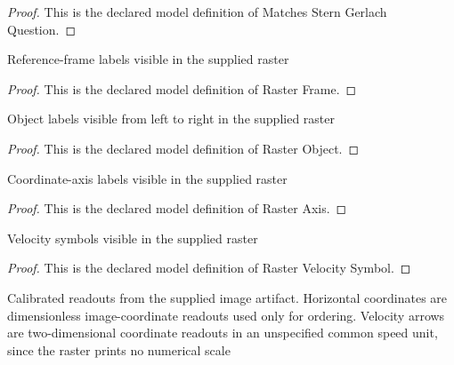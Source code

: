 \begin{proof}
  This is the declared model definition of Matches Stern Gerlach Question.
\end{proof}
\begin{definition}
  \label{def:physics:phyx-mini-0541:phyxminiproblems-problemphyxmini0541-rasterframe}
  Reference-frame labels visible in the supplied raster
\end{definition}
\begin{proof}
  This is the declared model definition of Raster Frame.
\end{proof}
\begin{definition}
  \label{def:physics:phyx-mini-0541:phyxminiproblems-problemphyxmini0541-rasterobject}
  Object labels visible from left to right in the supplied raster
\end{definition}
\begin{proof}
  This is the declared model definition of Raster Object.
\end{proof}
\begin{definition}
  \label{def:physics:phyx-mini-0541:phyxminiproblems-problemphyxmini0541-rasteraxis}
  Coordinate-axis labels visible in the supplied raster
\end{definition}
\begin{proof}
  This is the declared model definition of Raster Axis.
\end{proof}
\begin{definition}
  \label{def:physics:phyx-mini-0541:phyxminiproblems-problemphyxmini0541-rastervelocitysymbol}
  Velocity symbols visible in the supplied raster
\end{definition}
\begin{proof}
  This is the declared model definition of Raster Velocity Symbol.
\end{proof}
\begin{definition}
  \label{def:physics:phyx-mini-0541:phyxminiproblems-problemphyxmini0541-suppliedrelativityraster}
  Calibrated readouts from the supplied image artifact. Horizontal coordinates are dimensionless image-coordinate readouts used only for ordering. Velocity arrows are two-dimensional coordinate readouts in an unspecified common speed unit, since the raster prints no numerical scale
\end{definition}
